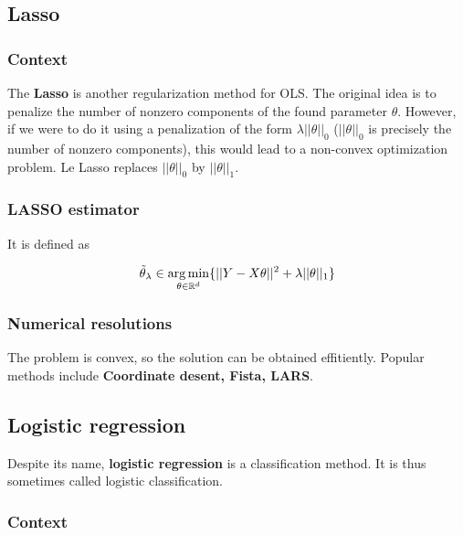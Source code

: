 \documentclass[
10pt, %
a4paper, %
oneside, %
headinclude,footinclude, %
BCOR5mm, %
]{scrartcl}
\begin{document}
\subsection{\large\color{MidnightBlue}Lasso}

\subsubsection{\large\color{Periwinkle}Context}

The \textbf{{Lasso}}  is another regularization method for OLS. The original idea is to penalize the number of nonzero components of the found parameter $\theta$. However, if we were to do it using a penalization of the form $\lambda||\theta||_0$ ($||\theta||_0$ is precisely the number of nonzero components), this would lead to a non-convex optimization problem. Le Lasso replaces $||\theta||_0$ by $ ||\theta||_1$.

\subsubsection{\large\color{Periwinkle}LASSO estimator}

It is defined as

\begin{equation}
    \tilde{\theta}_{\lambda}\in \operatorname*{arg\,min}_{\theta\in \mathbb{R}^d}\{||Y-X\theta||^2+\lambda ||\theta||_1\}
\end{equation}

\subsubsection{\large\color{Periwinkle}Numerical resolutions}

The problem is convex, so the solution can be obtained effitiently. Popular methods include \textbf{{Coordinate desent, Fista, LARS}}.

\subsection{\large\color{MidnightBlue}Logistic regression}
\label{subsec:logistic}

Despite its name, \textbf{{logistic regression}} is a classification method. It
is thus sometimes called logistic classification.

\subsubsection{\large\color{Periwinkle}Context}
\end{document}
